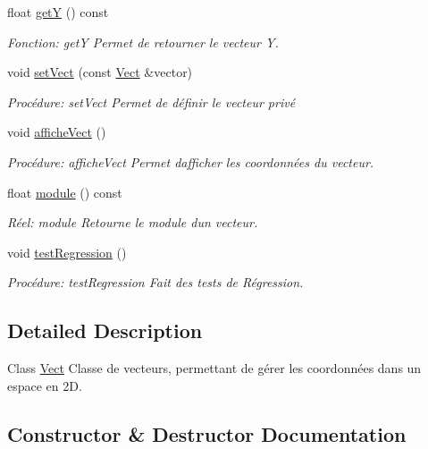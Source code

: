 \begin{DoxyCompactItemize}
float \hyperlink{classVect_a2e44111683aae147cd053ac6002f5992}{getY} () const
\begin{DoxyCompactList}\small\item\em Fonction\+: getY Permet de retourner le vecteur Y. \end{DoxyCompactList}\item 
void \hyperlink{classVect_a28408435bc900905d3416aef70140cd9}{set\+Vect} (const \hyperlink{classVect}{Vect} \&vector)
\begin{DoxyCompactList}\small\item\em Procédure\+: set\+Vect Permet de définir le vecteur privé \end{DoxyCompactList}\item 
void \hyperlink{classVect_afba6ce27d6700dddeb9272cdf39c66e3}{affiche\+Vect} ()
\begin{DoxyCompactList}\small\item\em Procédure\+: affiche\+Vect Permet d\textquotesingle{}afficher les coordonnées du vecteur. \end{DoxyCompactList}\item 
float \hyperlink{classVect_aa61c71b79a4d2f2cda092648a7268c4f}{module} () const
\begin{DoxyCompactList}\small\item\em Réel\+: module Retourne le module d\textquotesingle{}un vecteur. \end{DoxyCompactList}\item 
void \hyperlink{classVect_a734074001bba32f3d76e5cee612864f1}{test\+Regression} ()
\begin{DoxyCompactList}\small\item\em Procédure\+: test\+Regression Fait des tests de Régression. \end{DoxyCompactList}\end{DoxyCompactItemize}


\subsection{Detailed Description}
Class \hyperlink{classVect}{Vect} Classe de vecteurs, permettant de gérer les coordonnées dans un espace en 2D. 

\subsection{Constructor \& Destructor Documentation}
\mbox{\label{classVect_a1c153510458899146850b79a7277630b}} 
